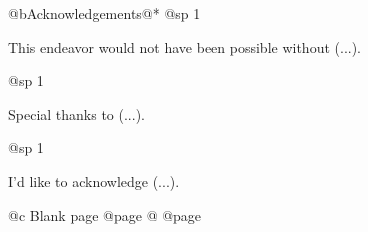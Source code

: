 @b{Acknowledgements}@*
@sp 1

This endeavor would not have been possible without (...).

@sp 1

Special thanks to (...).

@sp 1

I'd like to acknowledge (...).

@c Blank page
@page
@
@page
